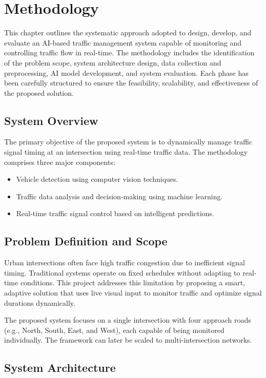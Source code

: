 \chapter{Methodology}

This chapter outlines the systematic approach adopted to design, develop, and evaluate an AI-based traffic management system capable of monitoring and controlling traffic flow in real-time. The methodology includes the identification of the problem scope, system architecture design, data collection and preprocessing, AI model development, and system evaluation. Each phase has been carefully structured to ensure the feasibility, scalability, and effectiveness of the proposed solution.

\section{System Overview}

The primary objective of the proposed system is to dynamically manage traffic signal timing at an intersection using real-time traffic data. The methodology comprises three major components:

\begin{itemize}
    \item Vehicle detection using computer vision techniques.
    \item Traffic data analysis and decision-making using machine learning.
    \item Real-time traffic signal control based on intelligent predictions.
\end{itemize}

\section{Problem Definition and Scope}

Urban intersections often face high traffic congestion due to inefficient signal timing. Traditional systems operate on fixed schedules without adapting to real-time conditions. This project addresses this limitation by proposing a smart, adaptive solution that uses live visual input to monitor traffic and optimize signal durations dynamically.

The proposed system focuses on a single intersection with four approach roads (e.g., North, South, East, and West), each capable of being monitored individually. The framework can later be scaled to multi-intersection networks.

\section{System Architecture}

